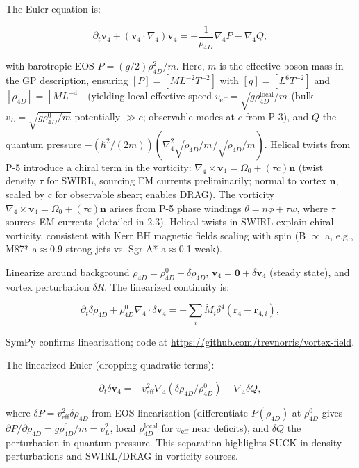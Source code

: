 The Euler equation is:

\begin{equation}
\partial_t \mathbf{v}_4 + (\mathbf{v}_4 \cdot \nabla_4) \mathbf{v}_4 = -\frac{1}{\rho_{4D}} \nabla_4 P - \nabla_4 Q,
\end{equation}

with barotropic EOS $P = (g/2) \rho_{4D}^2 / m$. Here, $m$ is the effective boson mass in the GP description, ensuring $[P] = [M L^{-2} T^{-2}]$ with $[g] = [L^6 T^{-2}]$ and $[\rho_{4D}] = [M L^{-4}]$ (yielding local effective speed $v_{\text{eff}} = \sqrt{g \rho_{4D}^{\text{local}} / m}$ (bulk $v_L = \sqrt{g \rho_{4D}^0 / m}$ potentially $\gg c$; observable modes at $c$ from P-3), and $Q$ the quantum pressure $-(\hbar^2 / (2m)) (\nabla_4^2 \sqrt{\rho_{4D}/m} / \sqrt{\rho_{4D}/m})$. Helical twists from P-5 introduce a chiral term in the vorticity: $\nabla_4 \times \mathbf{v}_4 = \Omega_0 + (\tau c) \mathbf{n}$ (twist density $\tau$ for SWIRL, sourcing EM currents preliminarily; normal to vortex $\mathbf{n}$, scaled by $c$ for observable shear; enables DRAG). The vorticity $\nabla_4 \times \mathbf{v}_4 = \Omega_0 + (\tau c) \mathbf{n}$ arises from P-5 phase windings $\theta = n\phi + \tau w$, where $\tau$ sources EM currents (detailed in 2.3). Helical twists in SWIRL explain chiral vorticity, consistent with Kerr BH magnetic fields scaling with spin (B $\propto$ a, e.g., M87* a$\approx$0.9 strong jets vs. Sgr A* a$\approx$0.1 weak).

Linearize around background $\rho_{4D} = \rho_{4D}^0 + \delta \rho_{4D}$, $\mathbf{v}_4 = \mathbf{0} + \delta \mathbf{v}_4$ (steady state), and vortex perturbation $\delta R$. The linearized continuity is:

\begin{equation}
\partial_t \delta \rho_{4D} + \rho_{4D}^0 \nabla_4 \cdot \delta \mathbf{v}_4 = -\sum_i \dot{M}_i \delta^4(\mathbf{r}_4 - \mathbf{r}_{4,i}),
\end{equation}

SymPy confirms linearization; code at \url{https://github.com/trevnorris/vortex-field}.

The linearized Euler (dropping quadratic terms):

\begin{equation}
\partial_t \delta \mathbf{v}_4 = -v_{\text{eff}}^2 \nabla_4 (\delta \rho_{4D} / \rho_{4D}^0) - \nabla_4 \delta Q,
\end{equation}

where $\delta P = v_{\text{eff}}^2 \delta \rho_{4D}$ from EOS linearization (differentiate $P(\rho_{4D})$ at $\rho_{4D}^0$ gives $\partial P / \partial \rho_{4D} = g \rho_{4D}^0 / m = v_L^2$, local $\rho_{4D}^{\text{local}}$ for $v_{\text{eff}}$ near deficits), and $\delta Q$ the perturbation in quantum pressure. This separation highlights SUCK in density perturbations and SWIRL/DRAG in vorticity sources.

